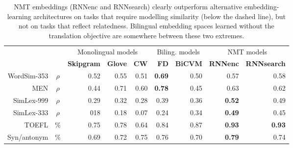 \begin{table}[t]
\small
\begin{center}
\begin{tabular}{r c | r  r  r  | r r | r r |}
\multicolumn{2}{c|}{~} &\multicolumn{3}{c|}{Monolingual models}  & \multicolumn{2}{c|}{\small Biling. models} & \multicolumn{2}{c|}{NMT models}\\  
    \multicolumn{2}{c|}{~} &\bf Skipgram &\bf Glove &\bf CW & \bf FD & \bf BiCVM & \bf RNNenc &\bf RNNsearch \\ 
\hline
WordSim-353   & \(\rho\) & 0.52 & 0.55 & 0.51 &{\bf  0.69} & 0.50 &   0.57 &  0.58 \\
MEN & \(\rho\) & 0.44 & 0.71 & 0.60 & {\bf 0.78} & 0.45 &  0.63 &  0.62  \\
\hdashline
SimLex-999 & \(\rho\) & 0.29 & 0.32 & 0.28 & 0.39 & 0.36 &   {\bf 0.52} &  0.49 \\
SimLex-333 & \(\rho\) &  018&0.18  &0.07  & 0.24  &  0.34 & { \bf 0.49}   & 0.45   \\
TOEFL & \(\%\) & 0.75 & 0.78 & 0.64 & 0.84 & 0.87 &  {\bf 0.93} &  {\bf 0.93} \\
Syn/antonym & \(\%\) & 0.69  & 0.72  &  0.75 & 0.76 & 0.70 &  {\bf 0.79} & 0.74 \\
\end{tabular}
\caption{ NMT embeddings (RNNenc and RNNsearch) clearly outperform alternative embedding-learning architectures on tasks that require modelling similarity (below the dashed line), but not on tasks that reflect relatedness. Bilingual embedding spaces learned without the translation objective are somewhere between these two extremes.}
\label{table:perf}
\end{center}
\vspace{-5mm}
\end{table}


